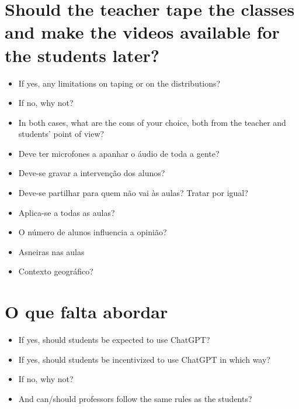 \documentclass[portuguese, 11pt, a4paper, titlepage, oneside]{article}
\begin{document}
\section{Should the teacher tape the classes and make the videos available for the students later?}
\begin{itemize}
  \item If yes, any limitations on taping or on the distributions?
  \item If no, why not?
  \item In both cases, what are the cons of your choice, both from the teacher and students' point of view?
  \item Deve ter microfones a apanhar o áudio de toda a gente?
  \item Deve-se gravar a intervenção dos alunos?
  \item Deve-se partilhar para quem não vai às aulas? Tratar por igual?
  \item Aplica-se a todas as aulas?
  \item O número de alunos influencia a opinião?
  \item Asneiras nas aulas
  \item Contexto geográfico?
\end{itemize}

\section{O que falta abordar}
\begin{itemize}
  \item If yes, should students be expected to use ChatGPT?
  \item If yes, should students be incentivized to use ChatGPT in which way?
  \item If no, why not?
  \item And can/should professors follow the same rules as the students?
\end{itemize}
\end{document}
